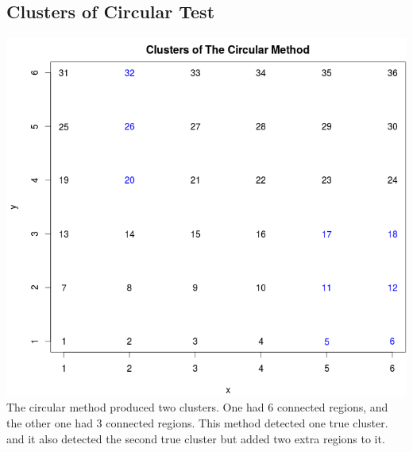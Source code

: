 \documentclass[12pt]{article}
\begin{document}
	\subsection{Clusters of Circular Test } 
	 \includegraphics[scale=0.3]{test_1} \\ The circular method produced two clusters. One had 6 connected regions, and the other one had 3 connected regions. This method detected one true cluster. and it also detected the second true cluster but added two extra regions to it. \\
\end{document}

